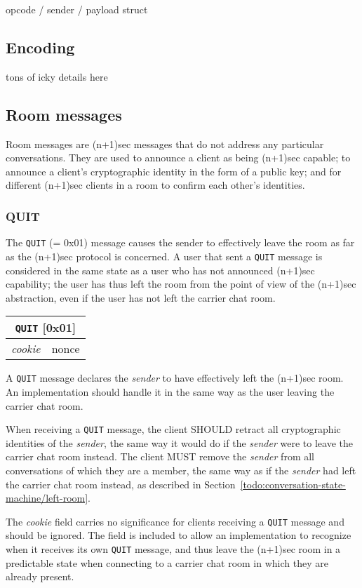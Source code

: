\documentclass{article}
\def\message#1{\texttt{#1}}
\def\field#1{\textit{#1}}
\newenvironment{basicmessage}[2]{
\newcommand{\messagefield}[2]{
\field{##1} & \textsf{##2} \\
\hline
}
\begin{tabular}{|l|l|}
\hline
\multicolumn{2}{|c|}{\message{#1} [#2]} \\
\hline
\hline
}{
\end{tabular}
}
\begin{document}
opcode / sender / payload struct

\subsection{Encoding}

tons of icky details here

\subsection{Room messages}

Room messages are (n+1)sec messages that do not address any particular conversations.
They are used to announce a client as being (n+1)sec capable; to announce a client's cryptographic identity in the form of a public key; and for different (n+1)sec clients in a room to confirm each other's identities.

\subsubsection{QUIT}
\label{sec:messages/quit}

The \message{QUIT} (= 0x01) message causes the sender to effectively leave the room as far as the (n+1)sec protocol is concerned.
A user that sent a \message{QUIT} message is considered in the same state as a user who has not announced (n+1)sec capability; the user has thus left the room from the point of view of the (n+1)sec abstraction, even if the user has not left the carrier chat room.

\begin{basicmessage}{QUIT}{0x01}
\messagefield{cookie}{nonce}
\end{basicmessage}

A \message{QUIT} message declares the \field{sender} to have effectively left the (n+1)sec room.
An implementation should handle it in the same way as the user leaving the carrier chat room.

When receiving a \message{QUIT} message, the client SHOULD retract all cryptographic identities of the \field{sender}, the same way it would do if the \field{sender} were to leave the carrier chat room instead.
The client MUST remove the \field{sender} from all conversations of which they are a member, the same way as if the \field{sender} had left the carrier chat room instead, as described in Section~\ref{todo:conversation-state-machine/left-room}.

The \field{cookie} field carries no significance for clients receiving a \message{QUIT} message and should be ignored.
The field is included to allow an implementation to recognize when it receives its own \message{QUIT} message, and thus leave the (n+1)sec room in a predictable state when connecting to a carrier chat room in which they are already present.
\end{document}
